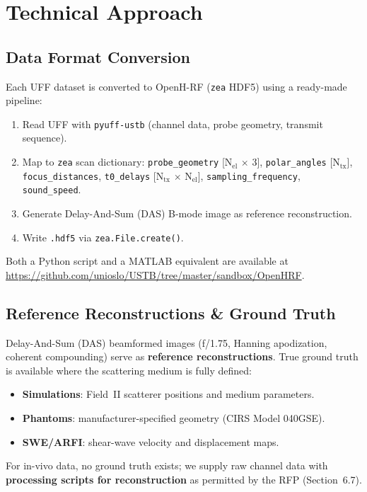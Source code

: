 \documentclass[11pt,a4paper]{article}
\begin{document}
\section{Technical Approach}

\subsection*{Data Format Conversion}
Each UFF dataset is converted to OpenH-RF (\texttt{zea} HDF5) using a ready-made pipeline:
\begin{enumerate}[nosep]
  \item Read UFF with \texttt{pyuff-ustb} (channel data, probe geometry, transmit sequence).
  \item Map to \texttt{zea} scan dictionary: \texttt{probe\_geometry} [N$_\text{el}$ $\times$ 3], \texttt{polar\_angles} [N$_\text{tx}$], \texttt{focus\_distances}, \texttt{t0\_delays} [N$_\text{tx}$ $\times$ N$_\text{el}$], \texttt{sampling\_frequency}, \texttt{sound\_speed}.
  \item Generate Delay-And-Sum (DAS) B-mode image as reference reconstruction.
  \item Write \texttt{.hdf5} via \texttt{zea.File.create()}.
\end{enumerate}
\noindent Both a Python script and a MATLAB equivalent are available at \url{https://github.com/unioslo/USTB/tree/master/sandbox/OpenHRF}.

\subsection*{Reference Reconstructions \& Ground Truth}
Delay-And-Sum (DAS) beamformed images (f/1.75, Hanning apodization, coherent compounding) serve as \textbf{reference reconstructions}.
True ground truth is available where the scattering medium is fully defined:
\begin{itemize}[nosep]
  \item \textbf{Simulations}: Field~II scatterer positions and medium parameters.
  \item \textbf{Phantoms}: manufacturer-specified geometry (CIRS Model 040GSE).
  \item \textbf{SWE/ARFI}: shear-wave velocity and displacement maps.
\end{itemize}
For in-vivo data, no ground truth exists; we supply raw channel data with \textbf{processing scripts for reconstruction} as permitted by the RFP (Section~6.7).
\end{document}
